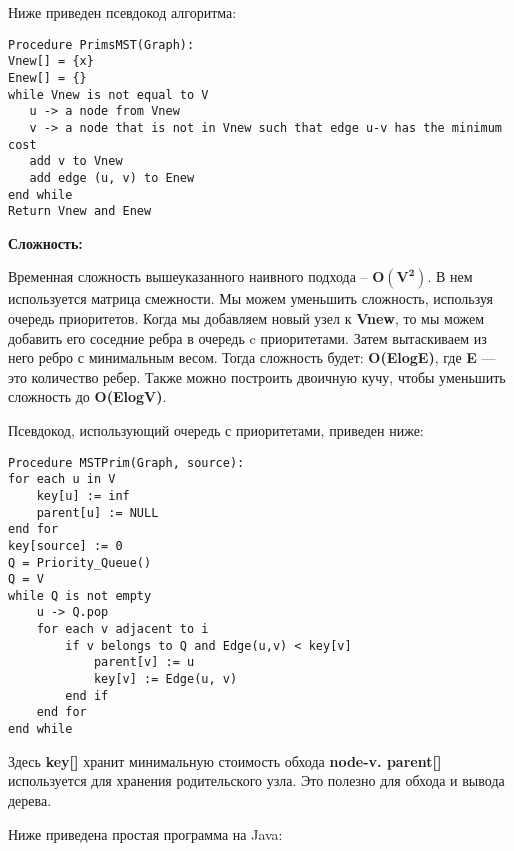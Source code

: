 \vspace{\baselineskip}

Ниже приведен псевдокод алгоритма:

\begin{tcolorbox}
\begin{verbatim}
Procedure PrimsMST(Graph):
Vnew[] = {x}
Enew[] = {}
while Vnew is not equal to V
   u -> a node from Vnew
   v -> a node that is not in Vnew such that edge u-v has the minimum cost
   add v to Vnew
   add edge (u, v) to Enew
end while
Return Vnew and Enew
\end{verbatim}
\end{tcolorbox}

\textbf{Сложность:}

\vspace{\baselineskip}

Временная сложность вышеуказанного наивного подхода -- $\mathbf{O(V^2)}$. В нем используется матрица смежности. Мы можем уменьшить сложность, используя очередь приоритетов. Когда мы добавляем новый узел к \textbf{Vnew}, то мы можем добавить его соседние ребра в очередь c приоритетами. Затем вытаскиваем из него ребро с минимальным весом. Тогда сложность будет: \textbf{O(ElogE)}, где \textbf{E} --- это количество ребер. Также можно построить двоичную кучу, чтобы уменьшить сложность до \textbf{O(ElogV)}.

\vspace{\baselineskip}

Псевдокод, использующий очередь с приоритетами, приведен ниже:

\begin{tcolorbox}
\begin{verbatim}
Procedure MSTPrim(Graph, source):
for each u in V
	key[u] := inf
	parent[u] := NULL
end for
key[source] := 0
Q = Priority_Queue()
Q = V
while Q is not empty
	u -> Q.pop
	for each v adjacent to i
		if v belongs to Q and Edge(u,v) < key[v]
			parent[v] := u
			key[v] := Edge(u, v)
		end if
	end for
end while
\end{verbatim}
\end{tcolorbox}

Здесь \textbf{key[]} хранит минимальную стоимость обхода \textbf{node-v. parent[]} используется для хранения родительского узла. Это полезно для обхода и вывода дерева.

\vspace{\baselineskip}

Ниже приведена простая программа на Java:

